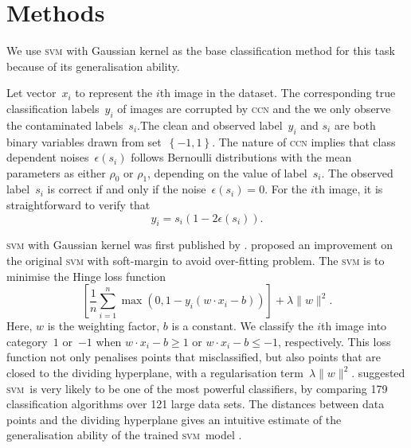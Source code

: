 \documentclass[12pt]{article} %
\newcommand{\svm}{\textsc{svm}}
\begin{document}
\section{Methods}\label{method}
We use \textsc{svm} with Gaussian kernel as the base classification method for this task because of its generalisation ability.

Let vector~$x_i$ to represent the $i$th image in the dataset. The corresponding true classification labels~$y_i$ of images are corrupted by \textsc{ccn} and the we only observe the contaminated labels~$s_i$.The clean and observed label~$y_i$ and $s_i$ are both binary variables drawn from set~$\left\{-1,1\right\}$.  The nature of \textsc{ccn} implies that class dependent noises~$\epsilon(s_i)$ follows Bernoulli distributions with the mean parameters as either $\rho_0$ or $\rho_1$, depending on the value of label~$s_i$. The observed label~$s_i$ is correct if and only if the noise~$\epsilon(s_i)=0$. For the $i$th image, it is straightforward to verify that
\begin{equation} \label{eq:noise}
y_i=s_i(1-2\epsilon(s_i)).
\end{equation}

\textsc{svm} with Gaussian kernel was first published by \citet{Boser:1992:TAO:130385.130401}. \citet{Cortes1995} proposed an improvement on the original \textsc{svm} with soft-margin  to  avoid over-fitting problem. The \textsc{svm} is to minimise the Hinge loss function
\begin{equation*}
\left[{\frac {1}{n}}\sum _{i=1}^{n}\max \left(0,1-y_{i}(w\cdot x_{i}-b)\right)\right]+\lambda \lVert w\rVert ^{2}.   
\end{equation*}
Here, $w$ is the weighting factor, $b$ is a constant. We classify the $i$th image into category~$1$ or~$-1$ when $w\cdot x_{i}-b\geq1$ or $w\cdot x_{i}-b\leq-1$, respectively. This loss function not only penalises points that misclassified, but also points that are closed to the dividing hyperplane, with a regularisation term~$\lambda \lVert w\rVert ^{2}$. \citet{Fernandez-Delgado:2014:WNH:2627435.2697065} suggested \svm\ is very likely to be one of the most powerful classifiers, by comparing 179 classification algorithms over 121 large data sets. The distances between data points and the dividing hyperplane gives an intuitive estimate of the generalisation ability of the trained \svm\ model \citep{hastie01statisticallearning}. 
\end{document}
